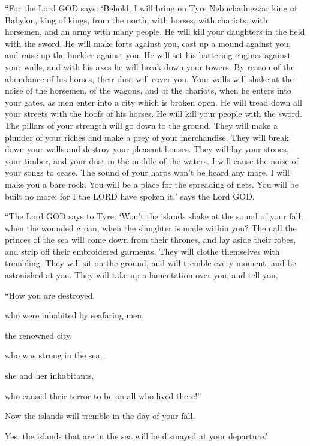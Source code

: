 \myverse{}“For the Lord GOD says: ‘Behold, I will bring on Tyre Nebuchadnezzar
king of Babylon, king of kings, from the north, with horses, with chariots, with horsemen, and an army
with many people.
\myverse{}He will kill your daughters in the field with the sword. He will make forts
against you, cast up a mound against you, and raise up the buckler against you.
\myverse{}He will set his battering engines against your walls, and with his axes he
will break down your towers.
\myverse{}By reason of the abundance of his horses, their dust will cover you. Your
walls will shake at the noise of the horsemen, of the wagons, and of the chariots, when he enters into
your gates, as men enter into a city which is broken open.
\myverse{}He will tread down all your streets with the hoofs of his horses. He will
kill your people with the sword. The pillars of your strength will go down to the ground.
\myverse{}They will make a plunder of your riches and make a prey of your merchandise.
They will break down your walls and destroy your pleasant houses. They will lay your stones, your timber,
and your dust in the middle of the waters.
\myverse{}I will cause the noise of your songs to cease. The sound of your harps won’t
be heard any more.
\myverse{}I will make you a bare rock. You will be a place for the spreading of nets.
You will be built no more; for I the LORD have spoken it,’ says the Lord GOD.

\myverse{}“The Lord GOD says to Tyre: ‘Won’t the islands shake at the
sound of your fall, when the wounded groan, when the slaughter is made within you?
\myverse{}Then all the princes of the sea will come down from their thrones, and lay
aside their robes, and strip off their embroidered garments. They will clothe themselves with trembling.
They will sit on the ground, and will tremble every moment, and be astonished at you.
\myverse{}They will take up a lamentation over you, and tell you,

“How you are destroyed,

who were inhabited by seafaring men,

the renowned city,

who was strong in the sea,

she and her inhabitants,

who caused their terror to be on all who lived there!”

\myverse{}Now the islands will tremble in the day of your fall.

Yes, the islands that are in the sea will be dismayed at your departure.’

